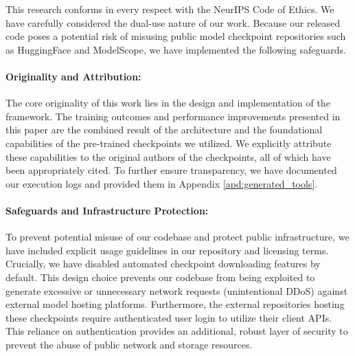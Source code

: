 This research conforms in every respect with the NeurIPS Code of Ethics. We have carefully considered the dual-use nature of our work. Because our released code poses a potential risk of misusing public model checkpoint repositories such as HuggingFace and ModelScope, we have implemented the following safeguards.
\paragraph{Originality and Attribution:} The core originality of this work lies in the design and implementation of the \method{} framework. The training outcomes and performance improvements presented in this paper are the combined result of the \method{} architecture and the foundational capabilities of the pre-trained checkpoints we utilized. We explicitly attribute these capabilities to the original authors of the checkpoints, all of which have been appropriately cited. To further ensure transparency, we have documented our execution logs and provided them in Appendix \ref{apd:generated_tools}.
\paragraph{Safeguards and Infrastructure Protection:} To prevent potential misuse of our codebase and protect public infrastructure, we have included explicit usage guidelines in our repository and licensing terms. Crucially, we have disabled automated checkpoint downloading features by default. This design choice prevents our codebase from being exploited to generate excessive or unnecessary network requests (unintentional DDoS) against external model hosting platforms. Furthermore, the external repositories hosting these checkpoints require authenticated user login to utilize their client APIs. This reliance on authentication provides an additional, robust layer of security to prevent the abuse of public network and storage resources.


